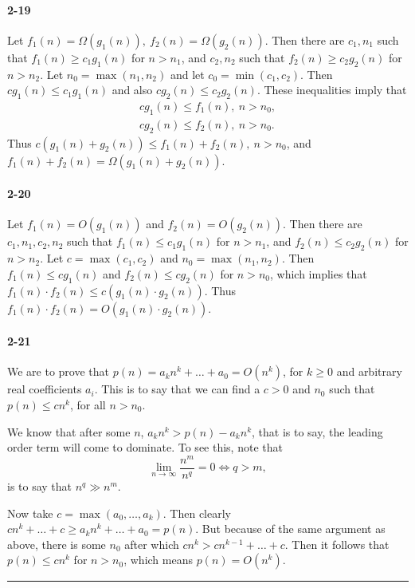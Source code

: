 \documentclass{report}
\newcommand{\okthen}{\rule[-1.4pt]{0.3em}{0.77em}}
\begin{document}
\paragraph{2-19} Let $f_1(n) = \Omega(g_1(n)),\ f_2(n) = \Omega(g_2(n))$. Then there are $c_1, n_1$ such that $f_1(n) \ge c_1 g_1(n)$ for $n > n_1$, and $c_2, n_2$ such that $f_2(n) \ge c_2 g_2(n)$ for $n > n_2$. Let $n_0 = \max(n_1, n_2)$ and let $c_0 = \min(c_1, c_2)$. Then $c g_1(n) \le c_1 g_1(n)$ and also $c g_2(n) \le c_2 g_2(n)$. These inequalities imply that
\begin{gather*}
	c g_1(n) \le f_1(n),\ n > n_0, \\
	c g_2(n) \le f_2(n),\ n > n_0.
\end{gather*}
Thus $c(g_1(n) + g_2(n)) \le f_1(n) + f_2(n),\ n > n_0$, and $f_1(n) + f_2(n) = \Omega(g_1(n) + g_2(n))$.

\paragraph{2-20} Let $f_1(n) = O(g_1(n))$ and $f_2(n) = O(g_2(n))$. Then there are $c_1, n_1, c_2, n_2$ such that $f_1(n) \le c_1 g_1(n)$ for $n > n_1$, and $f_2(n) \le c_2 g_2(n)$ for $n > n_2$. Let $c = \max(c_1, c_2)$ and $n_0 = \max(n_1, n_2)$. Then $f_1(n) \le c g_1(n)$ and $f_2(n) \le c g_2(n)$ for $n > n_0$, which implies that $f_1(n)\cdot f_2(n) \le c(g_1(n)\cdot g_2(n))$. Thus $f_1(n)\cdot f_2(n) = O(g_1(n)\cdot g_2(n))$.

\paragraph{2-21} We are to prove that $p(n) = a_k n^k + \ldots + a_0 = O(n^k)$, for $k \ge 0$ and arbitrary real coefficients $a_i$. This is to say that we can find a $c > 0$ and $n_0$ such that $p(n) \le c n^k$, for all $n > n_0$.

\smallskip

We know that after some $n$, $a_k n^k > p(n) - a_k n^k$, that is to say, the leading order term will come to dominate. To see this, note that
\[ \lim_{n\to\infty}\frac{n^m}{n^q} = 0 \iff q > m, \]
is to say that $n^q \gg n^m$.

Now take $c = \max(a_0,\ldots, a_k)$. Then clearly $c n^k + \ldots + c \ge a_k n^k + \ldots + a_0 = p(n)$. But because of the same argument as above, there is some $n_0$ after which $c n^k > c n^{k-1} + \ldots + c$. Then it follows that $p(n) \le c n^k$ for $n > n_0$, which means $p(n) = O(n^k)$.\ \okthen
\end{document}

